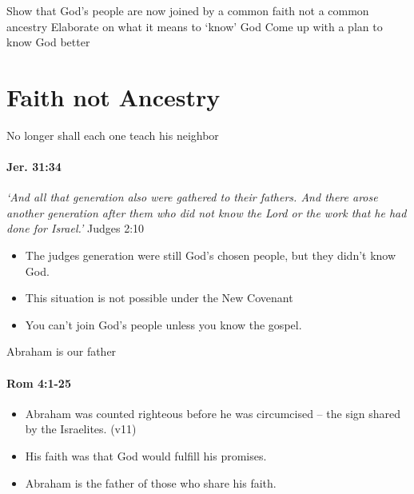 \begin{goals}
\goal Show that God's people are now joined by a common faith not a common ancestry 
\goal Elaborate on what it means to `know' God
\goal Come up with a plan to know God better

\end{goals}

\section{Faith not Ancestry}

\begin{frame}{No longer shall each one teach his neighbor}
\framesubtitle{Jer. 31:34}

\emph{`And all that generation also were gathered to their fathers. And there arose another generation after them who did not know the Lord or the work that he had done for Israel.'} Judges 2:10

\begin{itemize}
	\item The judges generation were still God's chosen people, but they didn't know God.
	\item This situation is not possible under the New Covenant
	\item You can't join God's people unless you know the gospel.
\end{itemize}

\end{frame}

\begin{frame}{Abraham is our father}
\framesubtitle{Rom 4:1-25}

\begin{itemize}
	\item Abraham was counted righteous before he was circumcised -- the sign shared by the Israelites. (v11)
	\item His faith was that God would fulfill his promises.
	\item Abraham is the father of those who share his faith.
\end{itemize}

\end{frame}

